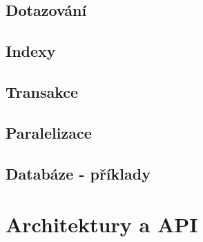


\subsection{Dotazování}



\subsection{Indexy}

\subsection{Transakce}

\subsection{Paralelizace}

\subsection{Databáze - příklady}


\section{Architektury a API} %






